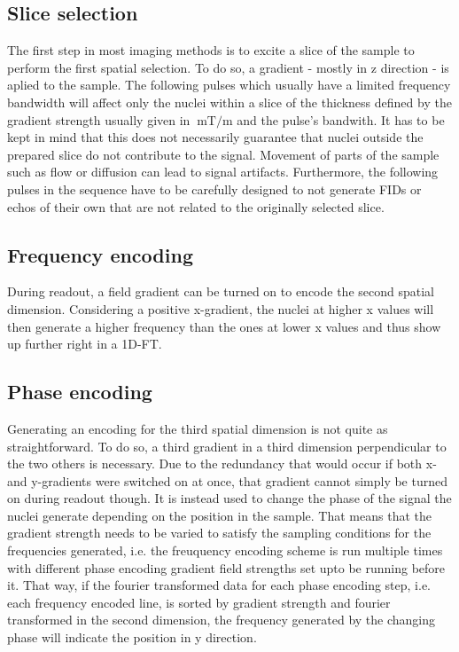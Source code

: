         \subsection{Slice selection}
            The first step in most imaging methods is to excite a slice of the sample to perform the
            first spatial selection. To do so, a gradient - mostly in z direction - is aplied to the
            sample. The following pulses which usually have a limited frequency bandwidth will
            affect only the nuclei within a slice of the thickness defined by the gradient strength
            usually given in $\SI{}{\milli\tesla\per\meter}$ and the pulse's bandwith. It has to be
            kept in mind that this does not necessarily guarantee that nuclei outside the prepared
            slice do not contribute to the signal. Movement of parts of the sample such as flow or
            diffusion can lead to signal artifacts. Furthermore, the following pulses in the
            sequence have to be carefully designed to not generate FIDs or echos of their own that
            are not related to the originally selected slice.
        \subsection{Frequency encoding}
            During readout, a field gradient can be turned on to encode the second spatial
            dimension. Considering a positive x-gradient, the nuclei at higher x values will then
            generate a higher frequency than the ones at lower x values and thus show up further
            right in a 1D-FT.
        \subsection{Phase encoding}
            Generating an encoding for the third spatial dimension is not quite as straightforward.  To do so, a third gradient in a third dimension perpendicular to the two others is necessary.  Due to the redundancy that would occur if both x- and y-gradients were switched on at once, that gradient cannot simply be turned on during readout though.  It is instead used to change the phase of the signal the nuclei generate depending on the position in the sample. That means that the gradient strength needs to be varied to satisfy the sampling conditions for the frequencies generated, i.e. the freuquency encoding scheme is run multiple times with different phase encoding gradient field strengths set upto be running before it. That way, if the fourier transformed data for each phase encoding step, i.e. each frequency encoded line, is sorted by gradient strength and fourier transformed in the second dimension, the frequency generated by the changing phase will indicate the position in y direction.
